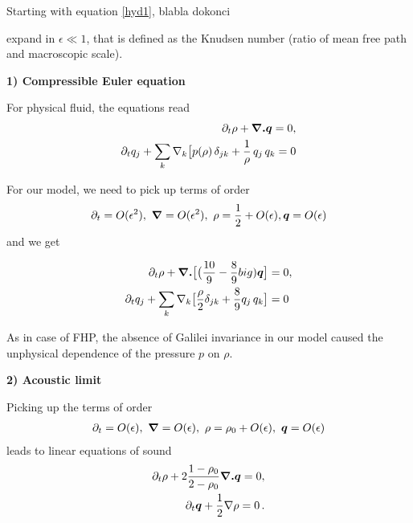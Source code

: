 Starting with equation \ref{hyd1}, blabla dokonci

expand in $\epsilon \ll 1$, that is defined as the Knudsen number (ratio  of mean free path and macroscopic scale).

\bigskip

\textbf{1) Compressible Euler equation}

For physical fluid, the equations read
\begin{align}
\begin{split}
\partial_t \rho + \bm{\nabla . q} = 0, \\
\partial_t q_j + \sum_k \nabla_k \big[ p(\rho) \, \delta_{jk} + \frac{1}{\rho} \, q_j \, q_k = 0
\end{split}
\end{align}

For our model, we need to pick up terms of order
\begin{align}
\begin{split}
\partial_t = O(\epsilon^2), ~ \bm{\nabla} = O(\epsilon^2),~\rho = \frac{1}{2} + O(\epsilon), \bm{q} = O(\epsilon) 
\end{split}
\end{align}
and we get

\begin{align}
\begin{split} \label{O2}
\partial_t \rho + \bm{\nabla.} \big[ \big( \frac{10}{9} - \frac{8}{9} big) \bm{q} \big] &= 0,\\
\partial_t q_j + \sum_k \nabla_k \big[\frac{\rho}{2} \delta_{jk} + \frac{8}{9}q_j\,q_k \big] &= 0
\end{split}
\end{align}

As in case of FHP, the absence of Galilei invariance in our model caused the unphysical dependence of the pressure $p$ on $\rho$.

\bigskip

\textbf{2) Acoustic limit}

Picking up the terms of order
\begin{align}
\partial_t = O(\epsilon),~ \bm{\nabla} = O(\epsilon),~ \rho = \rho_0 + O(\epsilon),~ \bm{q} = O(\epsilon)
\end{align}
leads to linear equations of sound
\begin{align}
\begin{split}
\partial_t \rho + 2\frac{1-\rho_0}{2-\rho_0} \bm{\nabla . q} = 0, \\
\partial_t \bm{q} + \frac{1}{2} \nabla \rho = 0 \,.
\end{split}
\end{align}



